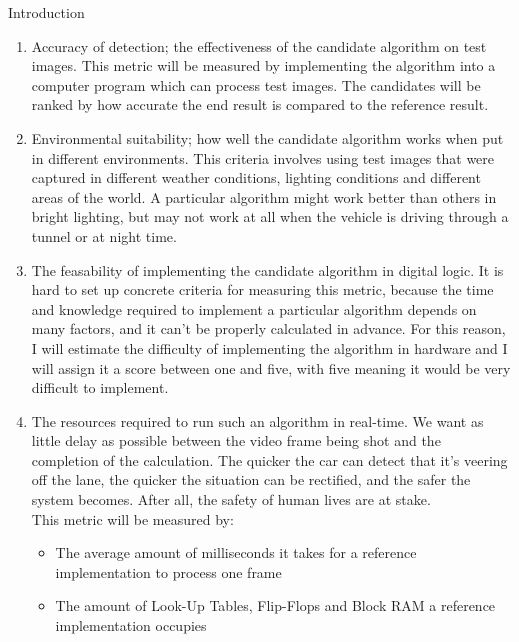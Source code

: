 \documentclass{matthijs}
\begin{document}
\begin{hoofdstuk}{Introduction}
		\begin{enumerate}

			\item	Accuracy of detection; the effectiveness of the candidate algorithm on test images.
				This metric will be measured by implementing the algorithm into a computer program which can process test images.
				The candidates will be ranked by how accurate the end result is compared to the reference result.

			\item	Environmental suitability; how well the candidate algorithm works when put in different environments.
				This criteria involves using test images that were captured in different weather conditions, lighting conditions and different areas of the world.
				A particular algorithm might work better than others in bright lighting, but may not work at all when the vehicle is driving through a tunnel or at night time.

			\item	The feasability of implementing the candidate algorithm in digital logic.
				It is hard to set up concrete criteria for measuring this metric, because the time and knowledge required to implement a particular algorithm depends on many factors, and it can't be properly calculated in advance.
				For this reason, I will estimate the difficulty of implementing the algorithm in hardware and I will assign it a score between one and five, with five meaning it would be very difficult to implement.

			\item	The resources required to run such an algorithm in real-time.
				We want as little delay as possible between the video frame being shot and the completion of the calculation.
				The quicker the car can detect that it's veering off the lane, the quicker the situation can be rectified, and the safer the system becomes.
				After all, the safety of human lives are at stake.\\
				This metric will be measured by:

				\begin{itemize}

					\item The average amount of milliseconds it takes for a reference implementation to process one frame
					\item The amount of Look-Up Tables, Flip-Flops and Block RAM a reference implementation occupies

				\end{itemize}

		\end{enumerate}

	\end{hoofdstuk}
\end{document}
